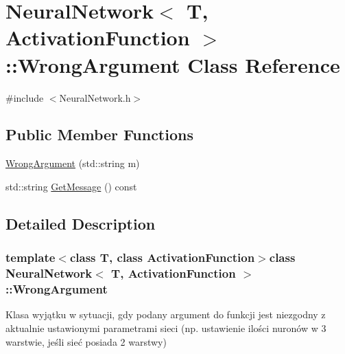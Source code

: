 \hypertarget{class_neural_network_1_1_wrong_argument}{\section{\-Neural\-Network$<$ \-T, \-Activation\-Function $>$\-:\-:\-Wrong\-Argument \-Class \-Reference}
\label{class_neural_network_1_1_wrong_argument}
}


{\ttfamily \#include $<$\-Neural\-Network.\-h$>$}

\subsection*{\-Public \-Member \-Functions}
\begin{DoxyCompactItemize}
\item 
\hyperlink{class_neural_network_1_1_wrong_argument_a7dddcaf96b854ada5554b05e0429ea6a}{\-Wrong\-Argument} (std\-::string m)
\item 
std\-::string \hyperlink{class_neural_network_1_1_wrong_argument_a708ad656cec99bc65e351dec562c5402}{\-Get\-Message} () const 
\end{DoxyCompactItemize}


\subsection{\-Detailed \-Description}
\subsubsection*{template$<$class T, class Activation\-Function$>$class Neural\-Network$<$ T, Activation\-Function $>$\-::\-Wrong\-Argument}

\-Klasa wyjątku w sytuacji, gdy podany argument do funkcji jest niezgodny z aktualnie ustawionymi parametrami sieci (np. ustawienie ilości nuronów w 3 warstwie, jeśli sieć posiada 2 warstwy) 


